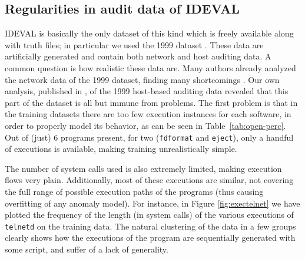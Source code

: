 \subsection{Regularities in audit data of IDEVAL}
\label{detection:evaluation:darpa} \ac{IDEVAL} is
basically the only dataset of this kind which is freely available
along with truth files; in particular we used the 1999 dataset
\citep{ideval_1999_doc}. These data are artificially generated and
contain both network and host auditing data. A common question is how
realistic these data are. Many authors already analyzed the network
data of the 1999 dataset, finding many shortcomings
\citep{mchugh:2000:testing, Analysis1999DARPA}. Our own analysis,
published in \citep{10.1109/TDSC.2008.69}, of the 1999 host-based
auditing data revealed that this part of the dataset is all but immune
from problems. The first problem is that in the training datasets
there are too few execution instances for each software, in order to
properly model its behavior, as can be seen in
Table~\ref{tab:open-perc}. Out of (just) 6 programs present, for two
(\texttt{fdformat} and \texttt{eject}), only a handful
of executions is available, making training unrealistically simple.

The number of system calls used is also extremely limited, making
execution flows very plain. Additionally, most of these executions are
similar, not covering the full range of possible execution paths of
the programs (thus causing overfitting of any
anomaly model). For instance, in Figure \ref{fig:exectelnet} we have
plotted the frequency of the length (in system calls) of the various
executions of \texttt{telnetd} on the training data. The natural
clustering of the data in a few groups clearly shows how the
executions of the program are sequentially generated with some script,
and suffer of a lack of generality.

